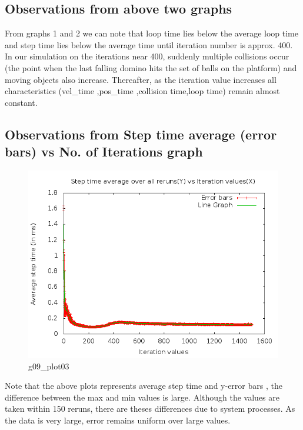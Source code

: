 \documentclass[11pt,english]{article}
\begin{document}
\subsection{Observations from above two graphs}
\indent \par{From graphs 1 and 2 we can note that loop time lies below the average loop time and step time lies below the average time until iteration number is approx. 400. In our simulation on the iterations near 400, suddenly multiple collisions occur (the point when the last falling domino hits the set of balls on the platform) and moving objects also increase. Thereafter, as the iteration value increases all characteristics (vel\_time ,pos\_time ,collision time,loop time)  remain almost constant.}

\subsection{Observations from Step time average (error bars) vs No. of Iterations graph}
\begin{figure}[h!]
\centering
\includegraphics[scale=.45]{g09_plot03}
\caption{g09\_plot03}
\end{figure}
\indent \par{Note that the above plots represents average step time and y-error bars , the difference between the max and min values is large. Although the values are taken within 150 reruns, there are theses differences due to system processes. As the data is very large, error remains uniform over large values.}
\end{document}
